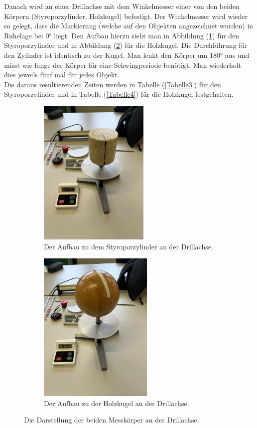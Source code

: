 \begin{flushleft}
    \newpage
    
    Danach wird an einer Drillachse mit dem Winkelmesser einer von den beiden Körpern (Styroporzylinder, Holzkugel) befestigt. 
    Der Winkelmesser wird wieder so gelegt, dass die Markierung (welche auf den Objekten angezeichnet wurden) in Ruhelage bei $0 \unit{\degree}$ liegt. 
    Den Aufbau hierzu sieht man in Abbildung (\ref{Abbildung4a}) für den Styroporzylinder und in Abbildung (\ref{Abbildung4b}) für die Holzkugel.
    Die Durchführung für den Zylinder ist identisch zu der Kugel. 
    Man lenkt den Körper um $ 180 \unit{\degree} $ aus und misst wie lange der Körper für eine Schwingperiode benötigt.
    Man wiederholt dies jeweils fünf mal für jedes Objekt. \\
    Die daraus resultierenden Zeiten werden in Tabelle (\ref{Tabelle3}) für den Styroporzylinder und in Tabelle (\ref{Tabelle4}) für die Holzkugel festgehalten. \\

    \begin{figure}
        \begin{subfigure}{0.60\textwidth}
            \centering
            \includegraphics[width=53mm]{bilder/zylinder.jpeg}
            \caption{Der Aufbau zu dem Styroporzylinder an der Drillachse.} 
            \label{Abbildung4a}
        \end{subfigure}
        \hfill
        \begin{subfigure}{0.60\textwidth}
            \centering
            \includegraphics[height=73mm]{bilder/kugel.jpeg}
            \caption{Der Aufbau zu der Holzkugel an der Drillachse.} 
            \label{Abbildung4b}
        \end{subfigure}
        \caption{Die Darstellung der beiden Messkörper an der Drillachse. }
        \label{Abbildung4}
    \end{figure}


\end{flushleft}
